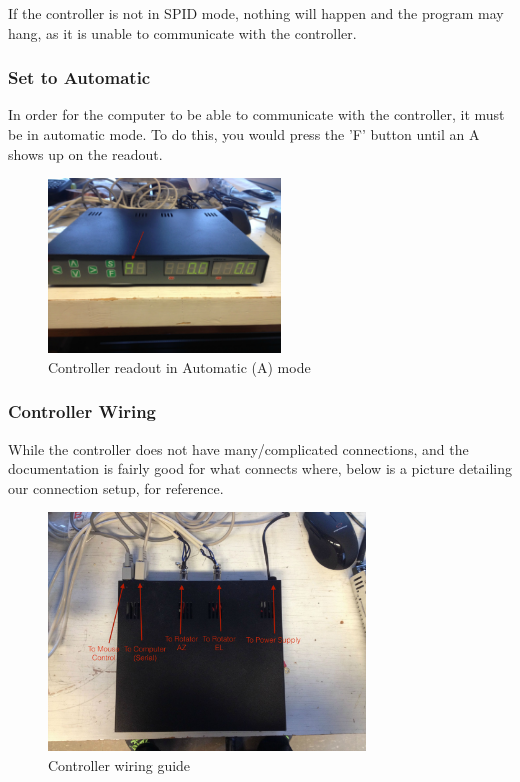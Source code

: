 \documentclass[11pt]{article} %
\begin{document}
If the controller is not in SPID mode, nothing will happen and the program may hang, as it is unable to communicate with the controller.

\subsubsection{Set to Automatic}

In order for the computer to be able to communicate with the controller, it must be in automatic mode. To do this, you would press the 'F' button until an A shows up on the readout. 

\begin{figure}[H]
  \centering
  \includegraphics[width=0.55\textwidth]{controller/03.jpeg}
  \caption{Controller readout in Automatic (A) mode}
\end{figure}

\subsubsection{Controller Wiring}

While the controller does not have many/complicated connections, and the documentation is fairly good for what connects where, below is a picture detailing our connection setup, for reference.

\begin{figure}[H]
  \centering
  \includegraphics[width=0.75\textwidth]{controller/04.jpeg}
  \caption{Controller wiring guide}
\end{figure}
\end{document}
